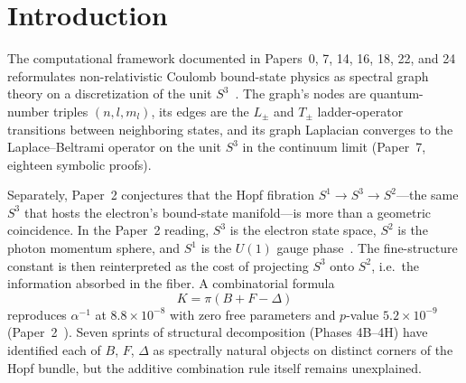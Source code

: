 \documentclass[aps,pra,twocolumn,superscriptaddress,longbibliography]{revtex4-2}
\begin{document}
\maketitle


\section{Introduction}
\label{sec:introduction}

The computational framework documented in Papers~0, 7, 14, 16, 18,
22, and 24 reformulates non-relativistic Coulomb bound-state physics
as spectral graph theory on a discretization of the unit
$S^3$~\cite{Paper0,Paper7,Paper14,Paper16,Paper18,Paper22,Paper24}.
The graph's nodes are quantum-number triples $(n, l, m_l)$, its edges
are the $L_\pm$ and $T_\pm$ ladder-operator transitions between
neighboring states, and its graph Laplacian converges to the
Laplace--Beltrami operator on the unit $S^3$ in the
continuum limit (Paper~7, eighteen symbolic proofs).

Separately, Paper~2 conjectures that the Hopf fibration
$S^1 \to S^3 \to S^2$---the same $S^3$ that hosts the electron's
bound-state manifold---is more than a geometric coincidence.  In the
Paper~2 reading, $S^3$ is the electron state space, $S^2$ is the
photon momentum sphere, and $S^1$ is the $U(1)$ gauge
phase~\cite{Paper2}.  The fine-structure constant is then
reinterpreted as the cost of projecting $S^3$ onto $S^2$, i.e.\ the
information absorbed in the fiber.  A combinatorial formula
\begin{equation}
K = \pi \left( B + F - \Delta \right)
\label{eq:K_intro}
\end{equation}
reproduces $\alpha^{-1}$ at $8.8 \times 10^{-8}$ with zero free
parameters and $p$-value $5.2 \times 10^{-9}$
(Paper~2~\cite{Paper2}).  Seven sprints of structural decomposition
(Phases 4B--4H) have identified each of $B$, $F$, $\Delta$ as
spectrally natural objects on distinct corners of the Hopf bundle,
but the additive combination rule itself remains unexplained.
\end{document}
